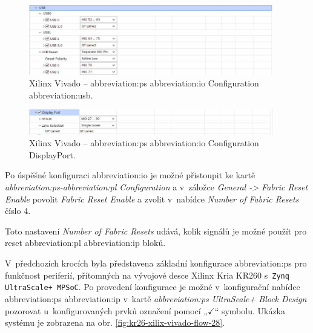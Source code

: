 \documentclass[a4paper, twoside, 11pt]{article}
\newcommand{\fbar}{\FloatBarrier}
\begin{document}
				\begin{figure}[htbp!]
					\centering
					\includegraphics[width=0.95\textwidth]{src/png/kr26-xilinx-vivado-flow/kr26-xilix-vivado-flow-25.jpg}
					\caption{Xilinx Vivado – \gls{abbreviation:ps} \gls{abbreviation:io} Configuration \gls{abbreviation:usb}.}
					\label{fig:kr26-xilix-vivado-flow-25}
				\end{figure}

				\begin{figure}[htbp!]
					\centering
					\includegraphics[width=0.95\textwidth]{src/png/kr26-xilinx-vivado-flow/kr26-xilix-vivado-flow-26.jpg}
					\caption{Xilinx Vivado – \gls{abbreviation:ps} \gls{abbreviation:io} Configuration DisplayPort.}
					\label{fig:kr26-xilix-vivado-flow-26}
				\end{figure}

				\fbar
				Po úspěšné konfiguraci \gls{abbreviation:io} je možné přistoupit ke kartě \textit{\gls{abbreviation:ps}-\gls{abbreviation:pl} Configuration} a v~záložce \textit{General -> Fabric Reset Enable} povolit \textit{Fabric Reset Enable} a zvolit v~nabídce \textit{Number of Fabric Resets} číslo 4.\par
				Toto nastavení \textit{Number of Fabric Resets} udává, kolik signálů je možné použít pro reset \gls{abbreviation:pl} \gls{abbreviation:ip} bloků. \cite{xilinx-ultra-scale-plus-mpsoc-processing-syste-product-guide} \cite{xilinx-wiki-atlassian-zynq-ultra-scale-plus-mpsoc-restart-solution}\par

				V~předchozích krocích byla představena základní konfigurace \gls{abbreviation:ps} pro funkčnost periferií, přítomných na vývojové desce Xilinx Kria KR260 s~\texttt{Zynq UltraScale+ MPSoC}. Po provedení konfigurace je možné v~konfigurační nabídce \gls{abbreviation:ps} \gls{abbreviation:ip} v~kartě \textit{\gls{abbreviation:ps} UltraScale+ Block Design} pozorovat u~konfigurovaných prvků označení pomocí „$\checkmark$“ symbolu. Ukázka systému je zobrazena na obr. \ref{fig:kr26-xilix-vivado-flow-28}.
\end{document}
